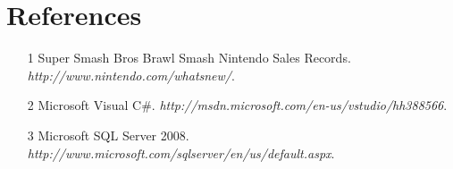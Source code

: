 \documentclass{article}
\begin{document}
\section{References}
\hangindent=1.4cm
\begin{itemize}
\item[1] Super Smash Bros Brawl Smash Nintendo Sales Records. \emph{http://www.nintendo.com/whatsnew/}.
\item[2] Microsoft Visual C\#. \emph{http://msdn.microsoft.com/en-us/vstudio/hh388566}.
\item[3] Microsoft SQL Server 2008. \emph{http://www.microsoft.com/sqlserver/en/us/default.aspx}.
\end{itemize}
\end{document}
